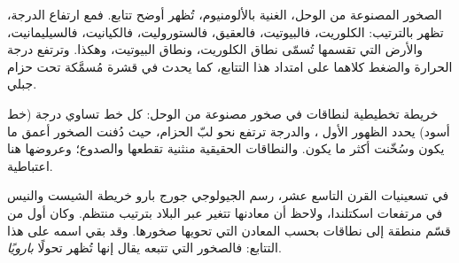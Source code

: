 الصخور المصنوعة من الوحل، الغنية بالألومنيوم، تُظهر أوضح تتابع. فمع
ارتفاع الدرجة، تظهر  بالترتيب: الكلوريت، فالبيوتيت،
فالعقيق، فالستوروليت، فالكيانيت، فالسيليمانيت، والأرض التي تقسمها
تُسمّى نطاق الكلوريت، ونطاق البيوتيت، وهكذا. وترتفع درجة الحرارة
والضغط كلاهما على امتداد هذا التتابع، كما يحدث في قشرة مُسمَّكة
تحت حزام جبلي.

\begin{omfigure}

{\small خريطة تخطيطية لنطاقات  في صخور مصنوعة من الوحل: كل
خط تساوي درجة (خط أسود) يحدد الظهور الأول ،
والدرجة ترتفع نحو لبّ الحزام، حيث دُفنت الصخور أعمق ما يكون
وسُخّنت أكثر ما يكون. والنطاقات الحقيقية منثنية تقطعها  والصدوع؛
وعروضها هنا اعتباطية.}
\end{omfigure}

\begin{history}
في تسعينيات القرن التاسع عشر، رسم الجيولوجي جورج بارو خريطة الشيست والنيس في
مرتفعات اسكتلندا، ولاحظ أن معادنها تتغير عبر
البلاد بترتيب منتظم. وكان أول من قسّم منطقة إلى نطاقات بحسب
المعادن التي تحويها صخورها. وقد بقي اسمه على هذا التتابع: فالصخور
التي تتبعه يقال إنها تُظهر تحولًا \emph{بارويًا}.
\end{history}

